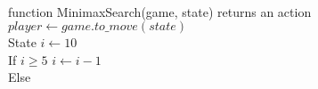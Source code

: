 \documentclass[preview]{standalone}
\begin{document}
\begin{center}
\begin{algorithmic}
            \\function MinimaxSearch(game, state) returns an action
            \\$player \gets game.to\_move(state)$
            \\State $i \gets 10$ 
            \\If {$i\geq 5$}
                \State $i \gets i-1$
            \\Else
            \end{algorithmic}
\end{center}
\end{document}
